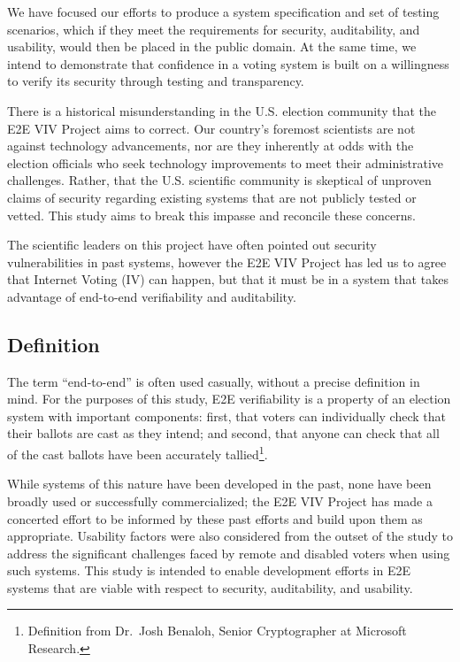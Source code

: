 We have focused our efforts to produce a system specification and set
of testing scenarios, which if they meet the requirements for
security, auditability, and usability, would then be placed in the
public domain. At the same time, we intend to demonstrate that
confidence in a voting system is built on a willingness to verify its
security through testing and transparency.

There is a historical misunderstanding in the U.S. election community
that the E2E VIV Project aims to correct. Our country’s foremost
scientists are not against technology advancements, nor are they
inherently at odds with the election officials who seek technology
improvements to meet their administrative challenges. Rather, that the
U.S. scientific community is skeptical of unproven claims of security
regarding existing systems that are not publicly tested or vetted. This
study aims to break this impasse and reconcile these concerns.

The scientific leaders on this project have often pointed out security
vulnerabilities in past systems, however the E2E VIV Project has led
us to agree that Internet Voting (IV) can happen, but that it must be
in a system that takes advantage of end-to-end verifiability and
auditability. 

\subsection{Definition}
\label{sec:definition}

The term ``end-to-end'' is often used casually, without a precise
definition in mind. For the purposes of this study, E2E verifiability
is a property of an election system with important components: first,
that voters can individually check that their ballots are cast as they
intend; and second, that anyone can check that all of the cast ballots
have been accurately tallied\footnote{Definition from Dr.~Josh
  Benaloh, Senior Cryptographer at Microsoft Research.}.

While systems of this nature have been developed in the past, none
have been broadly used or successfully commercialized; the E2E VIV
Project has made a concerted effort to be informed by these past
efforts and build upon them as appropriate. Usability factors were
also considered from the outset of the study to address the
significant challenges faced by remote and disabled voters when using
such systems. This study is intended to enable development efforts in
E2E systems that are viable with respect to security, auditability,
and usability.

